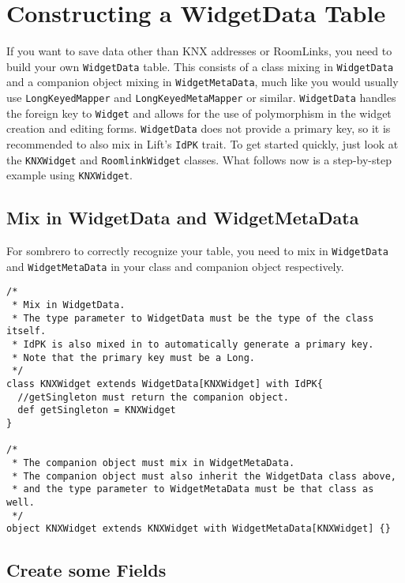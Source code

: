 \section{Constructing a WidgetData Table}

If you want to save data other than KNX addresses or RoomLinks, you need to build your own \lstinline!WidgetData! table. This consists of a class mixing in \lstinline!WidgetData! and a companion object mixing in \lstinline!WidgetMetaData!, much like you would usually use \lstinline!LongKeyedMapper! and \lstinline!LongKeyedMetaMapper! or similar. \lstinline!WidgetData! handles the foreign key to \lstinline!Widget! and allows for the use of polymorphism in the widget creation and editing forms. \lstinline!WidgetData! does not provide a primary key, so it is recommended to also mix in Lift's \lstinline!IdPK! trait. To get started quickly, just look at the \lstinline!KNXWidget! and \lstinline!RoomlinkWidget! classes. What follows now is a step-by-step example using \lstinline!KNXWidget!.

\subsection{Mix in WidgetData and WidgetMetaData}

For sombrero to correctly recognize your table, you need to mix in \lstinline!WidgetData! and \lstinline!WidgetMetaData! in your class and companion object respectively.

\begin{lstlisting}[caption=Mixing in!,label=lst:widgetdata:mixin]
/*
 * Mix in WidgetData.
 * The type parameter to WidgetData must be the type of the class itself.
 * IdPK is also mixed in to automatically generate a primary key.
 * Note that the primary key must be a Long.
 */
class KNXWidget extends WidgetData[KNXWidget] with IdPK{
  //getSingleton must return the companion object.
  def getSingleton = KNXWidget
}

/*
 * The companion object must mix in WidgetMetaData.
 * The companion object must also inherit the WidgetData class above,
 * and the type parameter to WidgetMetaData must be that class as well.
 */
object KNXWidget extends KNXWidget with WidgetMetaData[KNXWidget] {}
\end{lstlisting}


\subsection{Create some Fields}

